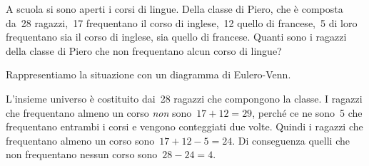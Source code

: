 {\begin{comment}
\begin{esempio}
\mbox{}

\begin{minipage}{.59 \textwidth}
 Alla palestra Anni Verdi, il lunedì si tengono allenamenti di pallavolo, 
 dalle~17.00 alle~18.30 e dalle~19.00 alle~20.30 gli allenamenti di calcio. 
 Quelli che frequentano la pallavolo sono~15, quelli che frequentano il 
calcio  sono~28, però ce ne sono~7 di loro che fanno entrambi gli 
allenamenti. 
 Quanti sono gli sportivi che si allenano il lunedì?
\end{minipage}
\hfill
\begin{minipage}{.39 \textwidth}
\begin{center}
 
 \end{center}
\end{minipage}

\emph{Dati} \(P=\{\text{pallavolo}\}\), 
 \(C=\{\text{calcio}\}\), \(\card(P)=15\), 
 \(\card(C)=28\) e~\(\card(P\cap C)=7\).
 
\emph{Obiettivo} Il problema chiede di determinare la cardinalità 
di~\(P\cup C\) 

\emph{Soluzione} 
 \(\card(P\cup C)=\card(P)+\card(C)-\card(P\cap C)=15+28-7=36\).

Generalizzando possiamo affermare \ che dati due insiemi finiti~\(A\) 
e~\(B\) la cardinalità dell'insieme~\(A\cup B\) è data dalla seguente 
formula: \(\card(A\cup B)=\card(A)+\card(B)-\card(A\cap B)\).
\end{esempio}

\end{comment}

\begin{esempio}
 A scuola si sono aperti i corsi di lingue. Della classe di Piero, che è 
 composta da~28 ragazzi,~17 frequentano il corso di inglese,~12
quello di francese,~5 di loro frequentano sia il corso di inglese, sia 
quello di francese. Quanti sono i ragazzi della classe di Piero che non
frequentano alcun corso di lingue?

Rappresentiamo la situazione con un diagramma di Eulero-Venn.

\begin{minipage}{.59 \textwidth}
L'insieme universo è costituito dai~28 ragazzi che
compongono la classe. I ragazzi che frequentano almeno un corso \emph{non} 
sono~\(17+12=29\), perché ce ne sono~5 che frequentano entrambi i corsi e
vengono conteggiati due volte. Quindi i ragazzi che frequentano almeno un 
corso sono~\(17+12-5=24\). Di conseguenza quelli che non frequentano
nessun corso sono~\(28-24=4\).
\end{minipage}
\hfill
\begin{minipage}{.39 \textwidth}
\begin{center}
 
 \end{center}
\end{minipage}
\end{esempio}

}
